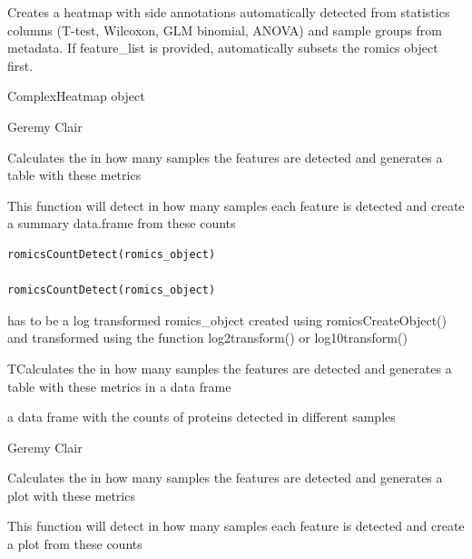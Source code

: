 \documentclass[a4paper]{book}
\begin{document}
%
\begin{Details}
Creates a heatmap with side annotations automatically detected from statistics columns (T-test, Wilcoxon, GLM binomial, ANOVA) and sample groups from metadata. If feature\_list is provided, automatically subsets the romics object first.
\end{Details}
%
\begin{Value}
ComplexHeatmap object
\end{Value}
%
\begin{Author}
Geremy Clair
\end{Author}
%
\begin{Description}
Calculates the in how many samples the features are detected and generates a table with these metrics

This function will detect in how many samples each feature is detected and create a summary data.frame from these counts
\end{Description}
%
\begin{Usage}
\begin{verbatim}
romicsCountDetect(romics_object)

romicsCountDetect(romics_object)
\end{verbatim}
\end{Usage}
%
\begin{Arguments}
\begin{ldescription}
\item[\code{romics\_object}] has to be a log transformed romics\_object created using romicsCreateObject() and transformed using the function log2transform() or log10transform()
\end{ldescription}
\end{Arguments}
%
\begin{Details}
TCalculates the in how many samples the features are detected and generates a table with these metrics in a data frame
\end{Details}
%
\begin{Value}
a data frame with the counts of proteins detected in different samples
\end{Value}
%
\begin{Author}
Geremy Clair
\end{Author}
%
\begin{Description}
Calculates the in how many samples the features are detected and generates a plot with these metrics

This function will detect in how many samples each feature is detected and create a plot from these counts
\end{Description}
\end{document}
